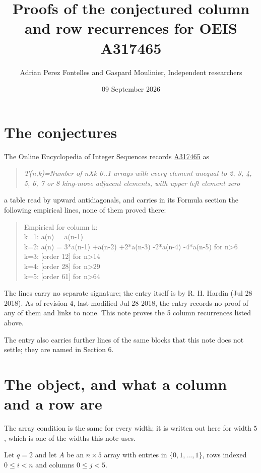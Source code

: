 \documentclass[11pt]{article}
\title{Proofs of the conjectured column and row recurrences for OEIS A317465}
\author{Adrian Perez Fontelles and Gaspard Moulinier, Independent researchers}
\date{09 September 2026}
\theoremstyle{definition}
\begin{document}
\maketitle
\section{The conjectures}

The Online Encyclopedia of Integer Sequences records \href{https://oeis.org/A317465}{A317465} as

\begin{quote}\itshape T(n,k)=Number of nXk 0..1 arrays with every element unequal to 2, 3, 4, 5, 6, 7 or 8 king-move adjacent elements, with upper left element zero\end{quote}

a table read by upward antidiagonals, and carries in its Formula section the following empirical lines, none of them proved there:

\begin{quote}\ttfamily Empirical for column k:\\
k=1: a(n) = a(n-1)\\k=2: a(n) = 3*a(n-1) +a(n-2) +2*a(n-3) -2*a(n-4) -4*a(n-5) for n>6\\k=3: [order 12] for n>14\\k=4: [order 28] for n>29\\k=5: [order 61] for n>64\end{quote}

The lines carry no separate signature; the entry itself is by R. H. Hardin (Jul 28 2018). As of revision 4, last modified Jul 28 2018, the entry records no proof of any of them and links to none. This note proves the 5 column recurrences listed above.

The entry also carries further lines of the same blocks that this note does not settle; they are named in Section 6.

\section{The object, and what a column and a row are}

The array condition is the same for every width; it is written out here for width $5$, which is one of the widths this note uses.

Let $q = 2$ and let $A$ be an $n \times 5$ array with entries in $\{0,1,\dots,1\}$, rows indexed $0 \le i < n$ and columns $0 \le j < 5$.
\end{document}
